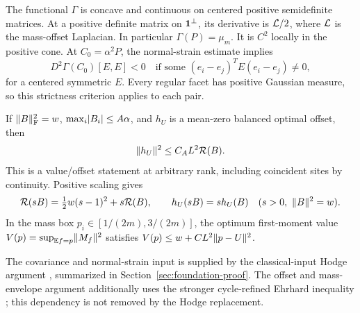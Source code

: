 \begin{prior}
\label{prior:value}
The functional $\Gamma$ is concave and
continuous on centered positive semidefinite matrices. At a positive
definite matrix on $\mathbf 1^\perp$, its derivative is $\mathcal L/2$, where
$\mathcal L$ is the mass-offset Laplacian. In particular
$\Gamma(P)=\mu_m$. It is $C^2$ locally in the positive cone. At
$C_0=\alpha^2P$, the normal-strain estimate implies
\begin{equation}\label{eq:reference-normal-strain}
 D^2\Gamma(C_0)[E,E]<0
 \quad\text{if some }(e_i-e_j)^TE(e_i-e_j)\ne0,
\end{equation}
for a centered symmetric $E$. Every regular facet has positive Gaussian
measure, so this strictness criterion applies to each pair.

If $\lVert B\rVert_{\mathrm F}^2=w$, $\max_i\lvert B_i\rvert\le A\alpha$, and $h_U$
is a mean-zero balanced optimal offset, then
\begin{equation}\label{eq:offset-input}
                         \lVert h_U\rVert^2\le C_A L^2\mathcal R(B).
\end{equation}
This is a value/offset statement at arbitrary rank, including coincident
sites by continuity. Positive scaling gives
\begin{equation}\label{eq:radial-identity}
 \mathcal R(sB)=\tfrac12 w(s-1)^2+s\mathcal R(B),\qquad
 h_U(sB)=s h_U(B)\quad(s>0,\ \lVert B\rVert^2=w).
\end{equation}
In the mass box $p_i\in[1/(2m),3/(2m)]$, the optimum first-moment value
$V(p)=\sup_{\mathbb E f=p}\lVert M_f\rVert^2$ satisfies
$V(p)\le w+CL^2\lVert p-U\rVert^2$.
\end{prior}
The covariance and normal-strain input is supplied by the classical-input
Hodge argument \cite{hodge}, summarized in Section~\ref{sec:foundation-proof}.
The offset and mass-envelope argument additionally uses the stronger
cycle-refined Ehrhard inequality \cite{cycle,currentassembly}; this dependency
is not removed by the Hodge replacement.

